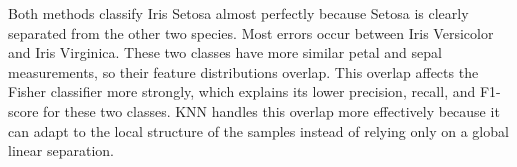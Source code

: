 \documentclass[11pt,a4paper]{article}
\begin{document}
Both methods classify Iris Setosa almost perfectly because Setosa is clearly separated from the other two species. Most errors occur between Iris Versicolor and Iris Virginica. These two classes have more similar petal and sepal measurements, so their feature distributions overlap. This overlap affects the Fisher classifier more strongly, which explains its lower precision, recall, and F1-score for these two classes. KNN handles this overlap more effectively because it can adapt to the local structure of the samples instead of relying only on a global linear separation.
\end{document}
